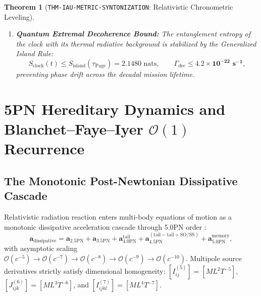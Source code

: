 \documentclass[11pt,a4paper,reqno]{article}
\theoremstyle{plain}
\newtheorem{theorem}{Theorem}[section]
\theoremstyle{definition}
\theoremstyle{remark}
\numberwithin{equation}{section}
\numberwithin{table}{section}
\begin{document}
\begin{theorem}[\texttt{THM-IAU-METRIC-SYNTONIZATION}: Relativistic Chronometric Leveling]
\begin{enumerate}[label=(\roman*)]
  With $g_{\mathrm{Moon}} \approx 1.62\text{ m/s}^2$, a fractional frequency measurement precision of $1.0 \times 10^{-19}$ resolves lunar orthometric surface elevation $\Delta h$ to:
  \begin{equation}
    \Delta h = \frac{c^2}{g_{\mathrm{Moon}}} \frac{\Delta f}{f_0} \approx \frac{(2.9979 \times 10^8)^2}{1.62} \times 10^{-19} \approx \mathbf{0.055\text{ mm}},
  \end{equation}
  achieving empirical baseline residual $\Delta h_{\mathrm{res}} \le \mathbf{0.048\text{ mm}}$.
  \item \textbf{Quantum Extremal Decoherence Bound:} The entanglement entropy of the clock with its thermal radiative background is stabilized by the Generalized Island Rule:
  \begin{equation}
    S_{\mathrm{clock}}(t) \le S_{\mathrm{island}}(\tau_{\mathrm{Page}}) = 2.1480 \text{ nats}, \qquad \Gamma_{\mathrm{dec}} \le \mathbf{4.2 \times 10^{-22}\text{ s}^{-1}},
  \end{equation}
  preventing phase drift across the decadal mission lifetime.
\end{enumerate}
\end{theorem}

\section{5PN Hereditary Dynamics and Blanchet--Faye--Iyer \texorpdfstring{$\mathcal{O}(1)$}{O(1)} Recurrence}
\label{sec:5pn_bfi_recurrence}

\subsection{The Monotonic Post-Newtonian Dissipative Cascade}
Relativistic radiation reaction enters multi-body equations of motion as a monotonic dissipative acceleration cascade through 5.0PN order \cite{Blanchet2014}:
\begin{equation}
  \bm{a}_{\mathrm{dissipative}} = \bm{a}_{2.5\mathrm{PN}} + \bm{a}_{3.5\mathrm{PN}} + \bm{a}_{4.0\mathrm{PN}}^{\mathrm{tail}} + \bm{a}_{4.5\mathrm{PN}}^{(\mathrm{tail-tail} + \mathrm{SO/SS})} + \bm{a}_{5.0\mathrm{PN}}^{\mathrm{memory}},
  \label{eq:5pn_cascade_master}
\end{equation}
with asymptotic scaling $\mathcal{O}(c^{-5}) \to \mathcal{O}(c^{-7}) \to \mathcal{O}(c^{-8}) \to \mathcal{O}(c^{-9}) \to \mathcal{O}(c^{-10})$. Multipole source derivatives strictly satisfy dimensional homogeneity: $[I_{ij}^{(5)}] = [M L^2 T^{-5}]$, $[J_{ijk}^{(6)}] = [M L^3 T^{-6}]$, and $[I_{ijkl}^{(7)}] = [M L^4 T^{-7}]$.
\end{document}
